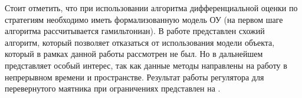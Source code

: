 Стоит отметить, что при использовании алгоритма дифференциальной оценки по стратегиям необходимо иметь формализованную модель ОУ (на первом шаге алгоритма рассчитывается гамильтониан). В работе \cite{DBLP:journals/corr/LeeS17a} представлен схожий алгоритм, который позволяет отказаться от использования модели объекта, который в рамках данной работы рассмотрен не был. Но в дальнейшем представляет особый интерес, так как данные методы направлены на работу в непрерывном времени и пространстве.
Результат работы регулятора для перевернутого маятника при ограничениях представлен на .
%
\begin{figure}[ht!]  
	\centering 
	\begin{minipage}[h]{0.49\linewidth}
	\end{minipage}
	\hfill
	\begin{minipage}[h]{0.49\linewidth}

\end{minipage}
\end{figure}
